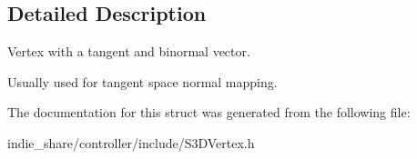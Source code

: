 \subsection{Detailed Description}
Vertex with a tangent and binormal vector. 

Usually used for tangent space normal mapping. 

The documentation for this struct was generated from the following file\+:\begin{DoxyCompactItemize}
\item 
indie\+\_\+share/controller/include/S3\+D\+Vertex.\+h\end{DoxyCompactItemize}
